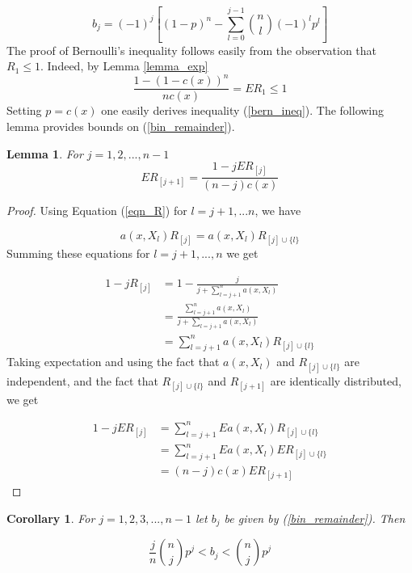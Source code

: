 \documentclass{article}
\newtheorem{lemma}[theorem]{Lemma}
\newtheorem{corollary}[theorem]{Corollary}
\begin{document}
\begin{equation}
\label{bin_remainder}
b_j=(-1)^j[(1-p)^n-\sum_{l=0}^{j-1}{n \choose l}(-1)^lp^l]
\end{equation}
The proof of Bernoulli's inequality follows easily from the 
observation that $R_1\leq 1$. Indeed, by Lemma \ref{lemma_exp}
\begin{equation*}
    \frac{1-(1-c(x))^n}{nc(x)}=ER_1\leq 1
\end{equation*}
Setting $p=c(x)$ one easily derives inequality (\ref{bern_ineq}). The following lemma provides bounds on 
(\ref{bin_remainder}).
\begin{lemma} For $j=1,2,...,n-1$
\begin{equation*}
    ER_{[j+1]}=\frac{1-jER_{[j]}}{(n-j)c(x)}
\end{equation*}

\end{lemma}
\begin{proof}
Using Equation (\ref{eqn_R}) for $l=j+1,...n$, we have

\begin{equation*}
    a(x,X_l)R_{[j]}=a(x,X_l)R_{[j]\cup\{l\}}
\end{equation*}
Summing these equations for $l=j+1,...,n$ we get

\begin{equation*}
\begin{split}
    1-jR_{[j]}&=1-\frac{j}{j+\sum_{l=j+1}^na(x,X_l)}\\
    &=\frac{\sum_{l=j+1}^n a(x,X_l)}{j+\sum_{l=j+1}a(x,X_l)}\\
    &=\sum_{l=j+1}^na(x,X_l)R_{[j]\cup\{l\}} 
\end{split}
\end{equation*}
Taking expectation and using the fact that $a(x,X_l)$ and $R_{[j]\cup\{l\}}$ are independent, and the fact that $R_{[j]\cup\{l\}}$ and $R_{[j+1]}$ are identically distributed, we get

\begin{equation*}
\begin{split}
    1-jER_{[j]}&=\sum_{l=j+1}^n Ea(x,X_l)R_{[j]\cup\{l\}}\\
    &=\sum_{l=j+1}^nEa(x,X_l)ER_{[j]\cup\{l\}}\\
    &=(n-j)c(x)ER_{[j+1]}
\end{split}    
\end{equation*}
\end{proof}

\begin{corollary}
For $j=1,2,3,...,n-1$ let $b_j$ be given by (\ref{bin_remainder}). Then 

\begin{equation*}
    \frac{j}{n}{n \choose j}p^j<b_j<{n\choose j}p^j
\end{equation*}
\end{corollary}
\end{document}
